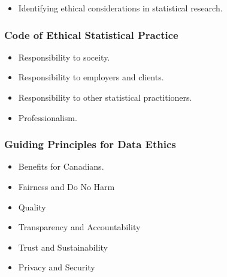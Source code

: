 \documentclass{beamer}
\begin{document}
\begin{frame}
  \begin{itemize}
    \item[] 
      Identifying ethical considerations in statistical research. 
  \end{itemize}
\end{frame}

\begin{frame}
  \frametitle{Code of Ethical Statistical Practice}
  \begin{itemize}
    \item[] 
      Responsibility to soceity.
      \vspace{0.5cm}
    \item[] 
      Responsibility to employers and clients.
      \vspace{0.5cm}
    \item[] 
      Responsibility to other statistical practitioners.
      \vspace{0.5cm}
    \item[] 
      Professionalism. 
  \end{itemize}
\end{frame}

\begin{frame}
  \frametitle{Guiding Principles for Data Ethics}
  \begin{itemize}
    \item[] 
      Benefits for Canadians.
      \vspace{0.5cm}
    \item[] 
      Fairness and Do No Harm
      \vspace{0.5cm}
    \item[] 
      Quality
      \vspace{0.5cm}
    \item[] 
      Transparency and Accountability 
      \vspace{0.5cm}
    \item[] 
      Trust and Sustainability
      \vspace{0.5cm}
    \item[] 
      Privacy and Security
  \end{itemize}
\end{frame}
\end{document}
